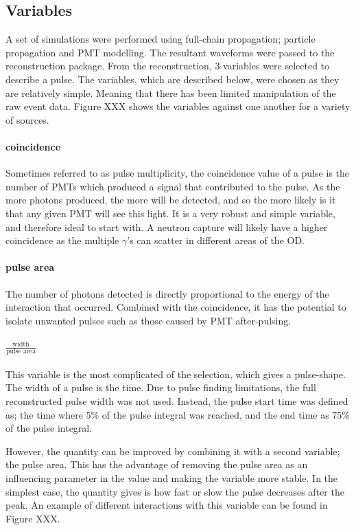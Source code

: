 \subsection{Variables}
\par
A set of simulations were performed using full-chain propagation; particle propagation and PMT modelling.
The resultant waveforms were passed to the reconstruction package.
From the reconstruction, 3 variables were selected to describe a pulse.
The variables, which are described below, were chosen as they are relatively simple.
Meaning that there has been limited manipulation of the raw event data.
Figure XXX shows the variables against one another for a variety of sources.


\paragraph{coincidence}
Sometimes referred to as pulse multiplicity, the coincidence value of a pulse is the number of PMTs which produced a signal that contributed to the pulse.
As the more photons produced, the more will be detected, and so the more likely is it that any given PMT will see this light.
It is a very robust and simple variable, and therefore ideal to start with.
A neutron capture will likely have a higher coincidence as the multiple $\gamma$'s can scatter in different areas of the OD.


\paragraph{pulse area}
The number of photons detected is directly proportional to the energy of the interaction that occurred.
Combined with the coincidence, it has the potential to isolate unwanted pulses such as those caused by PMT after-pulsing.


\paragraph{$\frac{\text{width}}{\text{pulse area}}$}
This variable is the most complicated of the selection, which gives a pulse-shape.
The width of a pulse is the time.
Due to pulse finding limitations, the full reconstructed pulse width was not used.
Instead, the pulse start time was defined as; the time where 5\% of the pulse integral was reached, and the end time as 75\% of the pulse integral.

However, the quantity can be improved by combining it with a second variable; the pulse area.
This has the advantage of removing the pulse area as an influencing parameter in the value and making the variable more stable.
In the simplest case, the quantity gives is how fast or slow the pulse decreases after the peak.
An example of different interactions with this variable can be found in Figure XXX.

